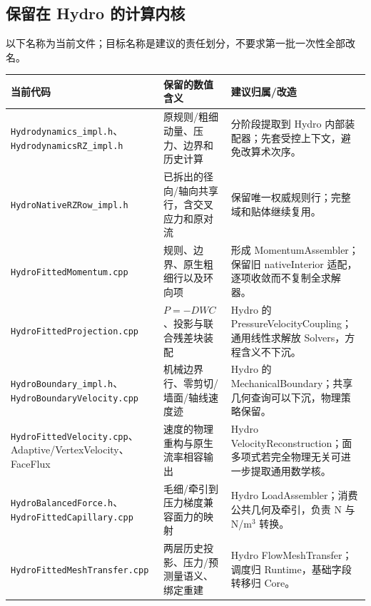 \documentclass[UTF8,a4paper,11pt,fontset=fandol]{ctexart}
\newcommand{\code}[1]{\nolinkurl{#1}}
\begin{document}
\subsection{保留在 Hydro 的计算内核}
以下名称为当前文件；目标名称是建议的责任划分，不要求第一批一次性全部改名。
\begin{longtable}{@{}P{.30\textwidth}P{.32\textwidth}P{.32\textwidth}@{}}
\toprule 当前代码 & 保留的数值含义 & 建议归属/改造\\\midrule\endhead
\code{Hydrodynamics_impl.h}、\code{HydrodynamicsRZ_impl.h} & 原规则/粗细动量、压力、边界和历史计算 & 分阶段提取到 Hydro 内部装配器；先套受控上下文，避免改算术次序。\\
\code{HydroNativeRZRow_impl.h} & 已拆出的径向/轴向共享行，含交叉应力和原对流 & 保留唯一权威规则行；完整域和贴体继续复用。\\
\code{HydroFittedMomentum.cpp} & 规则、边界、原生粗细行以及环向项 & 形成 MomentumAssembler；保留旧 nativeInterior 适配，逐项收敛而不复制全求解器。\\
\code{HydroFittedProjection.cpp} & $P=-DWC$、投影与联合残差块装配 & Hydro 的 PressureVelocityCoupling；通用线性求解放 Solvers，方程含义不下沉。\\
\code{HydroBoundary_impl.h}、\code{HydroBoundaryVelocity.cpp} & 机械边界行、零剪切/墙面/轴线速度迹 & Hydro 的 MechanicalBoundary；共享几何查询可以下沉，物理策略保留。\\
\code{HydroFittedVelocity.cpp}、Adaptive/VertexVelocity、FaceFlux & 速度的物理重构与原生流率相容输出 & Hydro VelocityReconstruction；面多项式若完全物理无关可进一步提取通用数学核。\\
\code{HydroBalancedForce.h}、\code{HydroFittedCapillary.cpp} & 毛细/牵引到压力梯度兼容面力的映射 & Hydro LoadAssembler；消费公共几何及牵引，负责 N 与 N/m$^3$ 转换。\\
\code{HydroFittedMeshTransfer.cpp} & 两层历史投影、压力/预测量语义、绑定重建 & Hydro FlowMeshTransfer；调度归 Runtime，基础字段转移归 Core。\\
\bottomrule
\end{longtable}
\end{document}
